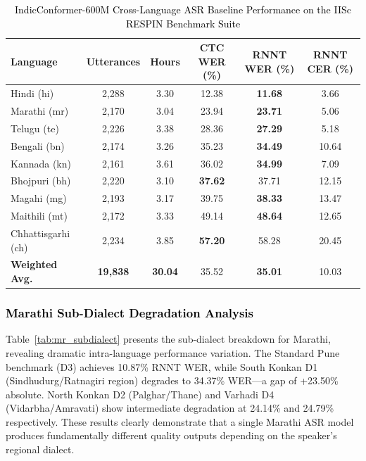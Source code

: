 \begin{table}[t]
\color{black}
\centering
\caption{\textcolor{black}{IndicConformer-600M Cross-Language ASR Baseline Performance on the IISc RESPIN Benchmark Suite}}
\label{tab:asr_baseline}
\begin{tabular}{lccccc}
\hline
\textbf{Language} & \textbf{Utterances} & \textbf{Hours} & \textbf{CTC WER (\%)} & \textbf{RNNT WER (\%)} & \textbf{RNNT CER (\%)} \\
\hline
Hindi (hi)         & 2,288 & 3.30 & 12.38 & \textbf{11.68} & 3.66 \\
Marathi (mr)       & 2,170 & 3.04 & 23.94 & \textbf{23.71} & 5.06 \\
Telugu (te)        & 2,226 & 3.38 & 28.36 & \textbf{27.29} & 5.18 \\
Bengali (bn)       & 2,174 & 3.26 & 35.23 & \textbf{34.49} & 10.64 \\
Kannada (kn)       & 2,161 & 3.61 & 36.02 & \textbf{34.99} & 7.09 \\
Bhojpuri (bh)      & 2,220 & 3.10 & \textbf{37.62} & 37.71 & 12.15 \\
Magahi (mg)        & 2,193 & 3.17 & 39.75 & \textbf{38.33} & 13.47 \\
Maithili (mt)      & 2,172 & 3.33 & 49.14 & \textbf{48.64} & 12.65 \\
Chhattisgarhi (ch) & 2,234 & 3.85 & \textbf{57.20} & 58.28 & 20.45 \\
\hline
\textbf{Weighted Avg.} & \textbf{19,838} & \textbf{30.04} & 35.52 & \textbf{35.01} & 10.03 \\
\hline
\end{tabular}
\end{table}

\subsubsection{\textcolor{black}{Marathi Sub-Dialect Degradation Analysis}}

Table~\ref{tab:mr_subdialect} presents the sub-dialect breakdown for Marathi, revealing dramatic intra-language performance variation. The Standard Pune benchmark (D3) achieves 10.87\% RNNT WER, while South Konkan D1 (Sindhudurg/Ratnagiri region) degrades to 34.37\% WER---a gap of +23.50\% absolute. North Konkan D2 (Palghar/Thane) and Varhadi D4 (Vidarbha/Amravati) show intermediate degradation at 24.14\% and 24.79\% respectively. These results clearly demonstrate that a single Marathi ASR model produces fundamentally different quality outputs depending on the speaker's regional dialect.

